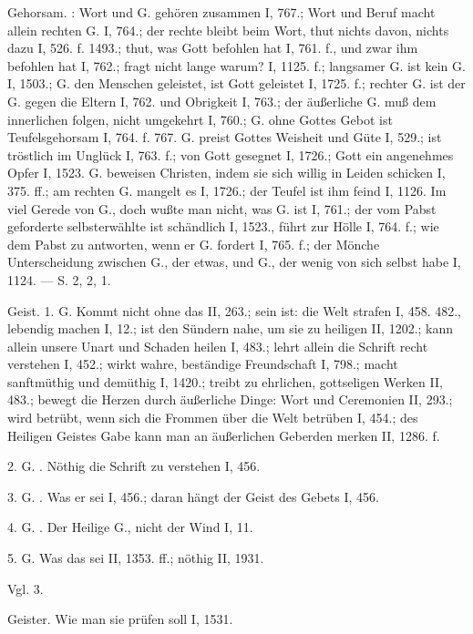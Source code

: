 Gehorsam. : Wort und G. gehören zusammen I, 767.; Wort und Beruf macht allein rechten G. I, 764.; der rechte bleibt beim Wort, thut nichts davon, nichts dazu I, 526. f. 1493.; thut, was Gott befohlen hat I, 761. f., und zwar ihm befohlen hat I, 762.; fragt nicht lange warum? I, 1125. f.; langsamer G. ist kein G. I, 1503.; G. den Menschen geleistet, ist Gott geleistet I, 1725. f.; rechter G. ist der G. gegen die Eltern I, 762. und Obrigkeit I, 763.; der äußerliche G. muß dem innerlichen folgen, nicht umgekehrt I, 760.; G. ohne Gottes Gebot ist Teufelsgehorsam I, 764. f. 767. G. preist Gottes Weisheit und Güte I, 529.; ist tröstlich im Unglück I, 763. f.; von Gott gesegnet I, 1726.; Gott ein angenehmes Opfer I, 1523. G. beweisen Christen, indem sie sich willig in Leiden schicken I, 375. ff.; am rechten G. mangelt es I, 1726.; der Teufel ist ihm feind I, 1126. Im  viel Gerede von G., doch wußte man nicht, was G. ist I, 761.; der vom Pabst geforderte selbsterwählte ist schändlich I, 1523., führt zur Hölle I, 764. f.; wie dem Pabst zu antworten, wenn er G. fordert I, 765. f.; der Mönche Unterscheidung zwischen G., der etwas, und G., der wenig von sich selbst habe I, 1124. — S.  2,  2,  1.

Geist. 1.  G. Kommt nicht ohne das  II, 263.; sein  ist: die Welt strafen I, 458. 482., lebendig machen I, 12.; ist den Sündern nahe, um sie zu heiligen II, 1202.; kann allein unsere Unart und Schaden heilen I, 483.; lehrt allein die Schrift recht verstehen I, 452.; wirkt wahre, beständige Freundschaft I, 798.; macht sanftmüthig und demüthig I, 1420.; treibt zu ehrlichen, gottseligen Werken II, 483.; bewegt die Herzen durch äußerliche Dinge: Wort und Ceremonien II, 293.; wird betrübt, wenn sich die Frommen über die Welt betrüben I, 454.; des Heiligen Geistes Gabe kann man an äußerlichen Geberden merken II, 1286. f.

2. G. . Nöthig die Schrift zu verstehen I, 456.

3. G. . Was er sei I, 456.; daran hängt der Geist des Gebets I, 456.

4. G. . Der Heilige G., nicht der Wind I, 11.

5.  G. Was das sei II, 1353. ff.; nöthig II, 1931.

Vgl.  3.

Geister. Wie man sie prüfen soll I, 1531.

